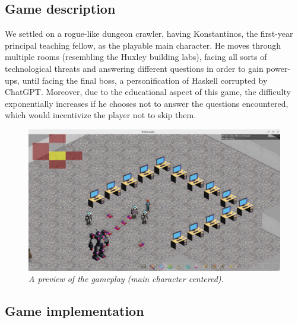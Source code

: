 \documentclass{article}
\begin{document}
\subsection{Game description}
We settled on a rogue-like dungeon crawler, having Konstantinos, the first-year principal teaching fellow, as the playable main character. He moves through multiple rooms (resembling the Huxley building labs), facing all sorts of technological threats and answering different questions in order to gain power-ups, until facing the final boss, a personification of Haskell corrupted by ChatGPT. Moreover, due to the educational aspect of this game, the difficulty exponentially increases if he chooses not to answer the questions encountered, which would incentivize the player not to skip them.

\begin{figure}[H]
\includegraphics[scale=0.2]{images/gamePreview.png}
\centering
\caption{\textit{A preview of the gameplay (main character centered).}}
\end{figure}


\subsection{Game implementation}
\end{document}
